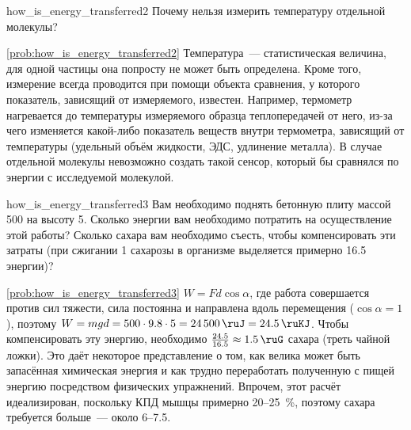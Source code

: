 \begin{problem}{}{how_is_energy_transferred2}
    Почему нельзя измерить температуру отдельной молекулы?
    \begin{sol}{\ref{prob:how_is_energy_transferred2}}
        Температура~--- статистическая величина, для одной частицы она попросту не может быть определена. Кроме того, измерение всегда проводится при помощи объекта сравнения, у которого показатель, зависящий от измеряемого, известен. Например, термометр нагревается до температуры измеряемого образца теплопередачей от него, из-за чего изменяется какой-либо показатель веществ внутри термометра, зависящий от температуры (удельный объём жидкости, ЭДС, удлинение металла). В случае отдельной молекулы невозможно создать такой сенсор, который бы сравнялся по энергии с исследуемой молекулой.
    \end{sol}
\end{problem}

\begin{problem}{}{how_is_energy_transferred3}
    Вам необходимо поднять бетонную плиту массой \qty{500}{\ruKg} на высоту \qty{5}{\ruM}. Сколько энергии вам необходимо потратить на осуществление этой работы? Сколько сахара вам необходимо съесть, чтобы компенсировать эти затраты (при сжигании \qty{1}{\ruG} сахарозы в организме выделяется примерно \qty{16,5}{\ruKJ} энергии)?
    \begin{sol}{\ref{prob:how_is_energy_transferred3}}
        $W = Fd\cos\alpha$, где работа совершается против сил тяжести, сила постоянна и направлена вдоль перемещения ($\cos\alpha = 1$), поэтому $W = mgd = 500 \cdot \num{9,8} \cdot 5 = \qty{24500}{\ruJ} = \qty{24,5}{\ruKJ}$. Чтобы компенсировать эту энергию, необходимо $\frac{\num{24,5}}{\num{16,5}} \approx \qty{1,5}{\ruG}$ сахара (треть чайной ложки). Это даёт некоторое представление о том, как велика может быть запасённая химическая энергия и как трудно переработать полученную с пищей энергию посредством физических упражнений. Впрочем, этот расчёт идеализирован, поскольку КПД мышцы примерно \num{20}--\qty{25}{\percent}, поэтому сахара требуется больше~--- около \num{6}--\qty{7,5}{\ruG}.
    \end{sol}
\end{problem}

